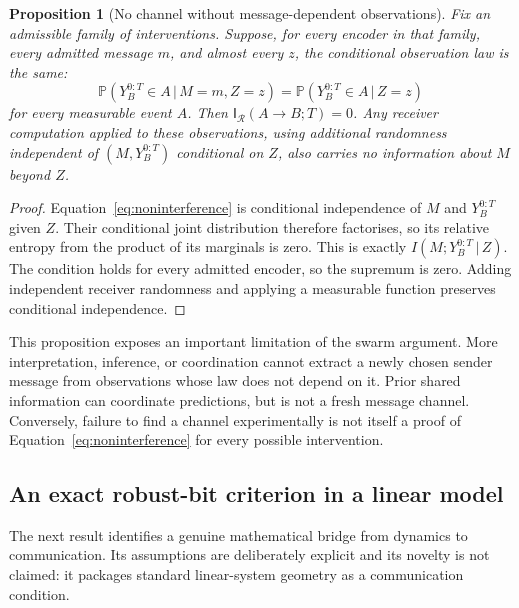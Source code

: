 \documentclass[11pt,a4paper]{article}
\newtheorem{proposition}[theorem]{Proposition}
\theoremstyle{definition}
\theoremstyle{remark}
\newcommand{\Prob}{\mathbb{P}}
\newcommand{\calR}{\mathcal{R}}
\newcommand{\given}{\,\vert\,}
\begin{document}
\begin{proposition}[No channel without message-dependent observations]\label{prop:noninterference}
Fix an admissible family of interventions. Suppose, for every encoder in that family, every admitted message $m$, and almost every $z$, the conditional observation law is the same:
\begin{equation}\label{eq:noninterference}
 \Prob(Y_B^{0:T}\in A\given M=m,Z=z)
 =\Prob(Y_B^{0:T}\in A\given Z=z)
\end{equation}
for every measurable event $A$. Then $\mathsf I_{\calR}(A\!\to\!B;T)=0$. Any receiver computation applied to these observations, using additional randomness independent of $(M,Y_B^{0:T})$ conditional on $Z$, also carries no information about $M$ beyond $Z$.
\end{proposition}
\begin{proof}
Equation~\eqref{eq:noninterference} is conditional independence of $M$ and $Y_B^{0:T}$ given $Z$. Their conditional joint distribution therefore factorises, so its relative entropy from the product of its marginals is zero. This is exactly $I(M;Y_B^{0:T}\given Z)$. The condition holds for every admitted encoder, so the supremum is zero. Adding independent receiver randomness and applying a measurable function preserves conditional independence.
\end{proof}
This proposition exposes an important limitation of the swarm argument. More interpretation, inference, or coordination cannot extract a newly chosen sender message from observations whose law does not depend on it. Prior shared information can coordinate predictions, but is not a fresh message channel. Conversely, failure to find a channel experimentally is not itself a proof of Equation~\eqref{eq:noninterference} for every possible intervention.

\subsection{An exact robust-bit criterion in a linear model}
The next result identifies a genuine mathematical bridge from dynamics to communication. Its assumptions are deliberately explicit and its novelty is not claimed: it packages standard linear-system geometry as a communication condition.
\end{document}
